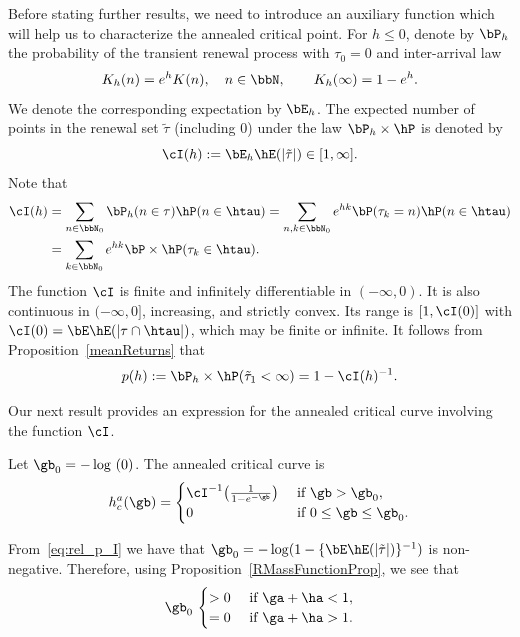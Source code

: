 Before stating further results, we need to introduce an auxiliary function which will help us to characterize the annealed critical point. For $h \leq 0$, denote by $\bP_h$ the probability of the transient renewal process with $\tau_0 = 0$ and inter-arrival law
\begin{equation}\label{hTransRenewal}
K_h(n) = e^h K(n), \quad n \in \bbN, \qquad K_h(\infty) = 1 - e^h.
\end{equation}
We denote the corresponding expectation by $\bE_h$. The expected number of points in the renewal set $\tilde\tau$ (including $0$) under the law $\bP_{h} \times \hP$ is denoted by
\begin{equation}
\cI(h) := \bE_h \hE(|\tilde\tau|) \in [1,\infty].
\end{equation}
Note that
\begin{equation}\label{eq:cI}
\begin{aligned}
\cI(h) &= \sum_{n \in \bbN_0} \bP_h(n \in \tau) \hP(n \in \htau) = \sum_{n,k \in \bbN_0} e^{h k} \bP(\tau_k = n) \hP(n \in \htau)\\
&= \sum_{k \in \bbN_0} e^{h k} \bP \times \hP(\tau_k \in \htau).
\end{aligned}
\end{equation}
The function $\cI$ is finite and infinitely differentiable in $(- \infty, 0)$. It is also continuous in $(- \infty, 0]$, increasing, and strictly convex. Its range is $[1,\cI(0)]$ with $\cI(0) = \bE \hE(|\tau \cap \htau|)$, which may be finite or infinite. It follows from Proposition~\ref{meanReturns} that
\begin{equation}\label{eq:rel_p_I}
p(h) := \bP_h \times \hP(\tilde\tau_1 < \infty) = 1 - \cI(h)^{-1}.
\end{equation}

Our next result provides an expression for the annealed critical curve involving the function $\cI$.

\begin{prop}\label{pr:ann.crit.curve}
Let $\gb_0 = - \log~(0)$. The annealed critical curve is
\begin{equation}\label{anncc}
h^a_c(\gb) =
\begin{cases}
\cI^{-1} \big(\frac{1}{1 - e^{-\gb}} \big) & \text{ if } \gb > \gb_0, \\
0 & \text{ if } 0 \leq \gb \leq \gb_0.
\end{cases}
\end{equation}
\end{prop}

\begin{remark}\label{rmk:signbeta0}
From~\eqref{eq:rel_p_I} we have that $\gb_0 = - \log(1 - \{\bE \hE(|\tilde\tau|)\}^{-1})$ is non-negative. Therefore, using Proposition~\ref{RMassFunctionProp}, we see that
\begin{equation}\label{eq:logp0}
\gb_0 \,
\begin{cases}
>0 & \text{ if } \ga + \ha < 1,\\
=0 & \text{ if } \ga + \ha > 1.
\end{cases}
\end{equation}
\end{remark}

